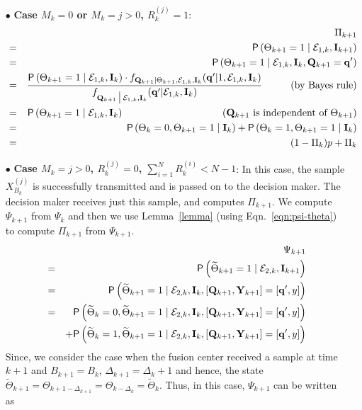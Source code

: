 \documentclass[acmtosn]{acmtrans2m}
\newcommand{\prob}[1]{\mathsf{P}\left(#1\right)}
\newcommand{\nn}{\nonumber \\}
{\theorembodyfont{\rmfamily}
\newtheorem{remarks}{Remark}[section]} \newtheorem{theorem}{Theorem}
\begin{document}
\begin{itemize}
\item[$\bullet$] {\bf Case $M_k=0$ or $M_k = j>0$, $R_k^{(j)} = 1$}:
\begin{eqnarray*}
& & \Pi_{k+1}\nn 
& = & \prob{\Theta_{k+1}=1 \mid \mathcal{E}_{1,k}, {\bf I}_{k+1}}\nn 
& = & \prob{\Theta_{k+1}=1 \mid \mathcal{E}_{1,k}, {\bf I}_{k}, {\bf
Q}_{k+1} = {\bf q}'}\nn 
& = & \frac{\prob{\Theta_{k+1}=1\mid \mathcal{E}_{1,k}, {\bf I}_{k}} \cdot 
            f_{{\bf Q}_{k+1} \mid \Theta_{k+1}, \mathcal{E}_{1,k}, {\bf
			I}_{k}}({\bf q}'| 1, \mathcal{E}_{1,k}, {\bf I}_k)}
			{f_{{\bf Q}_{k+1}\big\arrowvert \mathcal{E}_{1,k}, {\bf
			I}_k}({\bf q}'|\mathcal{E}_{1,k}, {\bf I}_k)} 
\hspace{10mm}  (\text{by Bayes rule} ) \nn
& = & \prob{\Theta_{k+1}=1\mid \mathcal{E}_{1,k}, {\bf I}_{k}}
\hspace{35mm}  ({\bf
Q}_{k+1} \ \text{is independent of} \ \Theta_{k+1}) \nn
& = & \prob{\Theta_k =0, \Theta_{k+1}=1\mid {\bf I}_{k}} + \prob{\Theta_k =1, \Theta_{k+1}=1\mid {\bf I}_{k}}\\ 
& = & (1-\Pi_k)p + \Pi_k 
\end{eqnarray*}


\item[$\bullet$] {\bf Case $M_k = j>0$, $R_k^{(j)} = 0$,
$\sum_{i=1}^NR_k^{(i)} < N-1$}:
In this case, the sample $X_{B_k}^{(j)}$ is successfully transmitted and
is passed on to the decision maker. The decision maker receives just
this sample, and computes $\Pi_{k+1}$. We compute $\Psi_{k+1}$ from $\Psi_k$ 
and then we use Lemma~\ref{lemma} (using Eqn.~\ref{eqn:psi-theta}) to compute 
$\Pi_{k+1}$ from $\Psi_{k+1}$.
\begin{eqnarray*}
& & \Psi_{k+1}\nn
& = & \prob{\widetilde\Theta_{k+1}=1\mid {\mathcal E}_{2,k}, {\bf I}_{k+1}} \\ 
& = & \prob{\widetilde\Theta_{k+1}=1\mid {\mathcal E}_{2,k}, {\bf
I}_{k}, [{\mathbf Q}_{k+1}, {\bf Y}_{k+1}]=[{\bf q}',y]} \\ 
& = & \prob{\widetilde\Theta_k = 0, \widetilde\Theta_{k+1}=1\mid {\mathcal E}_{2,k}, {\bf
I}_{k}, [{\mathbf Q}_{k+1}, {\bf Y}_{k+1}]=[{\bf q}',y]}\\
& & 
+ \prob{\widetilde\Theta_k = 1, \widetilde\Theta_{k+1}=1\mid {\mathcal E}_{2,k}, {\bf
I}_{k}, [{\mathbf Q}_{k+1}, {\bf Y}_{k+1}]=[{\bf q}',y]} 
\end{eqnarray*}
Since, we consider the case when the fusion center received a sample at time $k+1$ and
$B_{k+1}=B_k$, $\Delta_{k+1} = \Delta_k+1$ and hence, the state $\widetilde\Theta_{k+1} =
\Theta_{k+1-\Delta_{k+1}} = \Theta_{k-\Delta_k} = \widetilde\Theta_k$.
Thus, in this case, $\Psi_{k+1}$ can be written as



\end{itemize}
\end{document}
